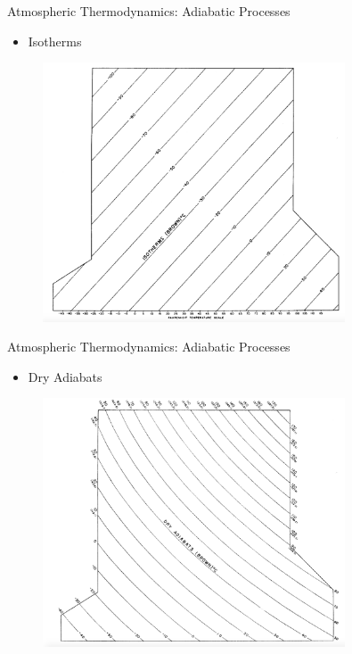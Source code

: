 
\begin{frame}{Atmospheric Thermodynamics: Adiabatic Processes}

\begin{itemize}
	\item Isotherms
\end{itemize}
\begin{figure}
	\includegraphics[width=0.8\textwidth]{fig5}
\end{figure}
\end{frame}


\begin{frame}{Atmospheric Thermodynamics: Adiabatic Processes}

\begin{itemize}
	\item Dry Adiabats
\end{itemize}
\begin{figure}
	\includegraphics[width=0.8\textwidth]{fig6}
\end{figure}
\end{frame}

